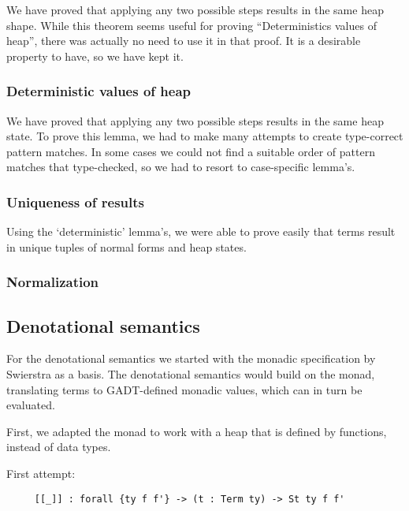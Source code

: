 \documentclass{article}
\begin{document}
We have proved that applying any two possible steps results in the same heap shape.
While this theorem seems useful for proving ``Deterministics values of heap'', there was actually no need to use it in that proof. It is a desirable property to have, so we have kept it.

\subsubsection{Deterministic values of heap}

We have proved that applying any two possible steps results in the
same heap state.  To prove this lemma, we had to make many attempts to
create type-correct pattern matches. In some cases we could not find a
suitable order of pattern matches that type-checked, so we had to
resort to case-specific lemma's.

\subsubsection{Uniqueness of results}

Using the `deterministic' lemma's, we were able to prove easily that terms result in unique tuples of normal forms and heap states.

\subsubsection{Normalization}


\subsection{Denotational semantics} %

For the denotational semantics we started with the monadic
specification by Swierstra as a basis. The denotational semantics
would build on the monad, translating terms to GADT-defined monadic
values, which can in turn be evaluated.

First, we adapted the monad to work with a heap that is defined by
functions, instead of data types.


First attempt:

\begin{lstlisting}
     [[_]] : forall {ty f f'} -> (t : Term ty) -> St ty f f'
\end{lstlisting}
\end{document}

